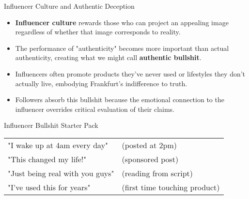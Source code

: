 \documentclass{beamer}
\begin{document}
	\begin{frame}{Influencer Culture and Authentic Deception}
		\begin{itemize}
			\item \textbf{Influencer culture} rewards those who can project an appealing image regardless of whether that image corresponds to reality.
			\item The performance of "authenticity" becomes more important than actual authenticity, creating what we might call \textbf{authentic bullshit}.
			\item Influencers often promote products they've never used or lifestyles they don't actually live, embodying Frankfurt's indifference to truth.
			\item Followers absorb this bullshit because the emotional connection to the influencer overrides critical evaluation of their claims.
		\end{itemize}
		
		\begin{block}{Influencer Bullshit Starter Pack}
			\begin{tabular}{ll}
				"I wake up at 4am every day" & (posted at 2pm) \\
				"This changed my life!" & (sponsored post) \\
				"Just being real with you guys" & (reading from script) \\
				"I've used this for years" & (first time touching product) \\
			\end{tabular}
		\end{block}
	\end{frame}
	
\end{document}
